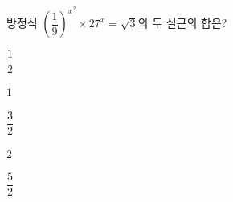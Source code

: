 방정식 $\left(\dfrac{1}{9}\right)^{x^2}\times 27^x=\sqrt{3}$의 두 실근의 합은?
\begin{choices32}{\rule[-3ex]{0pt}{8ex}$\dfrac{1}{2}$}{\rule[-3ex]{0pt}{8ex}$1$}{\rule[-3ex]{0pt}{8ex}$\dfrac{3}{2}$}{\rule[-3ex]{0pt}{8ex}$2$}{\rule[-3ex]{0pt}{8ex}$\dfrac{5}{2}$}\end{choices32}
